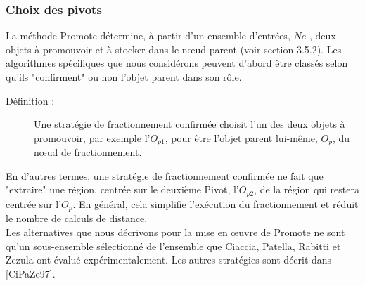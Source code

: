 \subsubsection{Choix des pivots}
La méthode Promote détermine, à partir d'un ensemble d'entrées, $ Ne $ , deux objets à promouvoir et à stocker dans le nœud parent (voir section 3.5.2). Les algorithmes spécifiques que nous considérons peuvent d'abord être classés selon qu'ils "confirment" ou non l'objet parent dans son rôle.

\begin{description}
	\item[Définition : ]  Une stratégie de fractionnement confirmée choisit l'un des deux objets à promouvoir, par exemple l'$ O_{p1} $, pour être l'objet parent lui-même, $ O_p $, du nœud de fractionnement.
\end{description}

En d'autres termes, une stratégie de fractionnement confirmée ne fait que "extraire" une région, centrée sur le deuxième Pivot, l'$ O_{p2} $, de la région qui restera centrée sur l'$ O_p $. En général, cela simplifie l'exécution du fractionnement et réduit le nombre de calculs de distance.\\

Les alternatives que nous décrivons pour la mise en œuvre de Promote ne sont qu'un sous-ensemble sélectionné de l'ensemble que Ciaccia, Patella, Rabitti et Zezula ont évalué expérimentalement. Les autres stratégies sont décrit dans [CiPaZe97].


